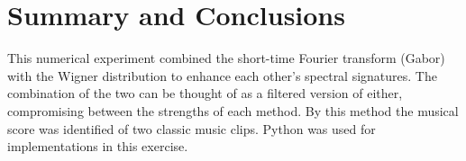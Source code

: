 \documentclass{article}
\begin{document}

\section{Summary and Conclusions}
This numerical experiment combined the short-time Fourier transform (Gabor) with the Wigner distribution to enhance each other's spectral signatures. The combination of the two can be thought of as a filtered version of either, compromising between the strengths of each method. By this method the musical score was identified of two classic music clips. Python was used for implementations in this exercise.



\end{document}
